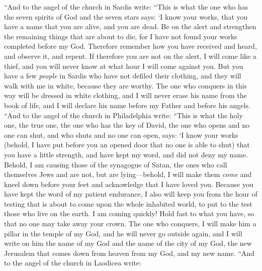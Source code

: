\begin{biblechapter} %
 “And to the angel of the church in Sardis write:
\verse “This is what the one who has the seven spirits of God and the seven stars says: ‘I know your works, that you have a name that you are alive, and you are dead.
\verse Be on the alert and strengthen the remaining things that are about to die, for I have not found your works completed before my God.
\verse Therefore remember how you have received and heard, and observe it, and repent. If therefore you are not on the alert, I will come like a thief, and you will never know at what hour I will come against you.
\verse But you have a few \textit{people} in Sardis who have not defiled their clothing, and they will walk with me in white, because they are worthy.
\verse The one who conquers in this way will be dressed in white clothing, and I will never erase his name from the book of life, and I will declare his name before my Father and before his angels.
 “And to the angel of the church in Philadelphia write:
\verse “This is what the holy one, the true one, the one who has the key of David, the one who opens and no one can shut, and who shuts and no one can open, says:
\verse ‘I know your works (behold, I have put before you an opened door that no one is able to shut) that you have a little strength, and have kept my word, and did not deny my name.
\verse Behold, I am causing those of the synagogue of Satan, the ones who call themselves Jews and are not, but are lying—behold, I will make them \textit{come} and kneel down before your feet and acknowledge that I have loved you.
\verse Because you have kept the word of my patient endurance, I also will keep you from the hour of testing that is about to come upon the whole inhabited world, to put to the test those who live on the earth.
\verse I am coming quickly! Hold fast to what you have, so that no one may take away your crown.
\verse The one who conquers, I will make him a pillar in the temple of my God, and he will never go outside again, and I will write on him the name of my God and the name of the city of my God, the new Jerusalem that comes down from heaven from my God, and my new name.
 “And to the angel of the church in Laodicea write:

\end{biblechapter}
